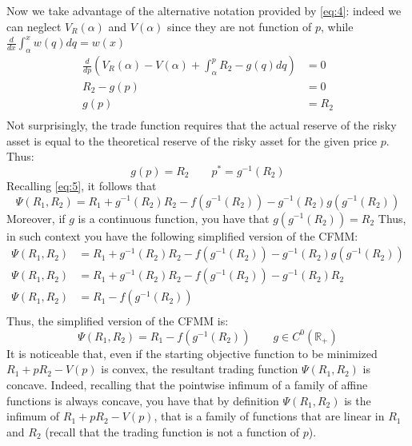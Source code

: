 \documentclass[12pt]{article}
\begin{document}
Now we take advantage of the alternative notation provided by \eqref{eq:4}: indeed we can neglect $V_R(\alpha)$ and $V(\alpha)$ since they are not function of $p$, while $\frac{d}{dx}\int_{\alpha}^x w(q) dq = w(x)$
\begin{align*}
    \frac{d}{dp} \left(V_R(\alpha) -V(\alpha) + \int_{\alpha}^p R_2 -g(q) dq  \right) & = 0  \\
    R_2 -g(p)                                                                         & =0   \\
    g(p)                                                                              & =R_2 \\
\end{align*}
Not surprisingly, the trade function requires that the actual reserve of the risky asset is equal to the theoretical reserve of the risky asset for the given price $p$. \newline
Thus:
\begin{equation}
    g(p)=R_2 \qquad p^* = g^{-1}(R_2) \label{eq:6}
\end{equation}
Recalling \eqref{eq:5}, it follows that
\begin{equation}
    \Psi(R_1,R_2) = R_1 + g^{-1}(R_2)R_2 - f(g^{-1}(R_2)) - g^{-1}(R_2)g(g^{-1}(R_2)) \label{eq:7}
\end{equation}
Moreover, if $g$ is a continuous function, you have that $g(g^{-1}(R_2))=R_2$
Thus, in such context you have the following simplified version of the CFMM:
\begin{align*}
    \Psi(R_1,R_2) & = R_1 + g^{-1}(R_2)R_2 - f(g^{-1}(R_2)) - g^{-1}(R_2)g(g^{-1}(R_2)) \\
    \Psi(R_1,R_2) & = R_1 + g^{-1}(R_2)R_2 - f(g^{-1}(R_2)) - g^{-1}(R_2)R_2            \\
    \Psi(R_1,R_2) & = R_1 - f(g^{-1}(R_2))                                              \\
\end{align*}
Thus, the simplified version of the CFMM is:
\begin{equation}
    \Psi(R_1,R_2) = R_1 - f(g^{-1}(R_2)) \qquad g\in C^0(\mathbb{R_+}) \label{eq:8}
\end{equation}
It is noticeable that, even if the starting objective function to be minimized $R_1 +pR_2 -V(p)$ is convex, the resultant trading function $\Psi(R_1,R_2)$ is concave. \newline
Indeed, recalling that the pointwise infimum of a family of affine functions is always concave, you have that
by definition $\Psi(R_1,R_2)$ is the infimum of $R_1 +pR_2 -V(p)$, that is a family of functions that are linear in $R_1$ and $R_2$ (recall that the trading function is not a function of $p$).
\end{document}
